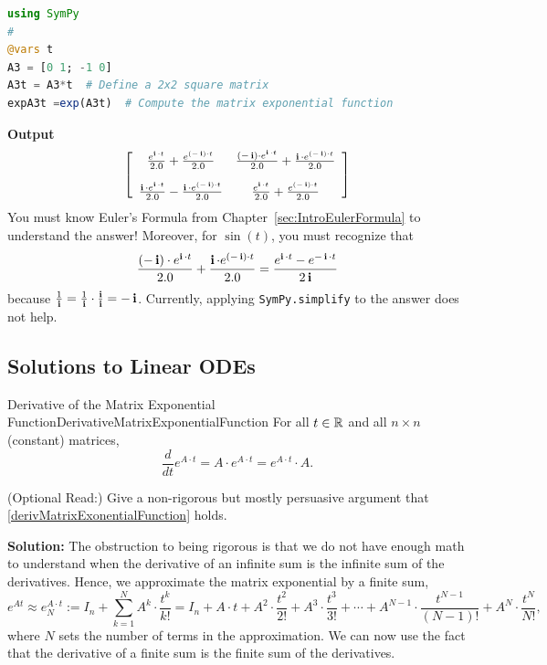 \begin{lstlisting}[language=Julia,style=mystyle]
using SymPy
# 
@vars t
A3 = [0 1; -1 0]
A3t = A3*t  # Define a 2x2 square matrix
expA3t =exp(A3t)  # Compute the matrix exponential function
\end{lstlisting}
\textbf{Output} 
$$\left[
\begin{array}{cc}
\frac{e^{\mathop{\bm{\mathrm i}} \cdot t}}{2.0} + \frac{e^{\left(  - \mathop{\bm{\mathrm i}} \right) \cdot t}}{2.0} & \frac{\left(  - \mathop{\bm{\mathrm i}} \right) \cdot e^{\mathop{\bm{\mathrm i}} \cdot t}}{2.0} + \frac{\mathop{\bm{\mathrm i}} \cdot e^{\left(  - \mathop{\bm{\mathrm i}} \right) \cdot t}}{2.0} \\[1em]
\frac{\mathop{\bm{\mathrm i}} \cdot e^{\mathop{\bm{\mathrm i}} \cdot t}}{2.0} - \frac{\mathop{\bm{\mathrm i}} \cdot e^{\left(  - \mathop{\bm{\mathrm i}}\right) \cdot t}}{2.0} & \frac{e^{\mathop{\bm{\mathrm i}} \cdot t}}{2.0} + \frac{e^{\left(  -\mathop{\bm{\mathrm i}} \right) \cdot t}}{2.0} \\
\end{array}
\right]$$
You must know Euler's Formula from Chapter~\ref{sec:IntroEulerFormula} to understand the answer! Moreover, for $\sin(t)$, you must recognize that 
$$ \frac{\left(  - \mathop{\bm{\mathrm i}} \right) \cdot e^{\mathop{\bm{\mathrm i}} \cdot t}}{2.0} + \frac{\mathop{\bm{\mathrm i}} \cdot e^{\left(  - \mathop{\bm{\mathrm i}} \right) \cdot t}}{2.0}  = \frac{e^{\mathop{\bm{\mathrm i}} \cdot t}- e^{-\mathop{\bm{\mathrm i}} \cdot t}}{2 \mathop{\bm{\mathrm i}}} $$
because $\frac{1}{\mathop{\bm{\mathrm i}}} = \frac{1}{\mathop{\bm{\mathrm i}}}\cdot \frac{\mathop{\bm{\mathrm i}}}{\mathop{\bm{\mathrm i}}} = -\mathop{\bm{\mathrm i}}$. Currently, applying \texttt{SymPy.simplify} to the answer does not help. 


\bigskip

\subsection{Solutions to Linear ODEs}

\begin{propColor}{Derivative of the Matrix Exponential Function}{DerivativeMatrixExponentialFunction}
For all $t \in \mathbb R$ and all $n \times n$ (constant) matrices,
\begin{equation}
    \label{derivMatrixExonentialFunction}
    \frac{d}{dt} e^{A \cdot t} = A \cdot e^{A \cdot t}= e^{A \cdot t} \cdot A.
\end{equation}


\end{propColor}



\bigskip

\begin{example}  (Optional Read:)  Give a non-rigorous but mostly persuasive argument that \eqref{derivMatrixExonentialFunction} holds.
    
\end{example}
\textbf{Solution:} The obstruction to being rigorous is that we do not have enough math to understand when the derivative of an infinite sum is the infinite sum of the derivatives. Hence, we approximate the matrix exponential by a finite sum,
$$e^{At} \approx e_N^{A \cdot t}:= I_n + \sum_{k=1}^N A^{k} \cdot \frac{t^{k}}{k!} = I_n + A \cdot t + A^2 \cdot \frac{t^2}{2!} + A^3 \cdot \frac{t^3}{3!}+  \cdots +  A^{N-1} \cdot \frac{t^{N-1}}{(N-1)!} +   A^{N} \cdot \frac{t^{N}}{N!},$$
where $N$ sets the number of terms in the approximation. We can now use the fact that the derivative of a finite sum is the finite sum of the derivatives.

